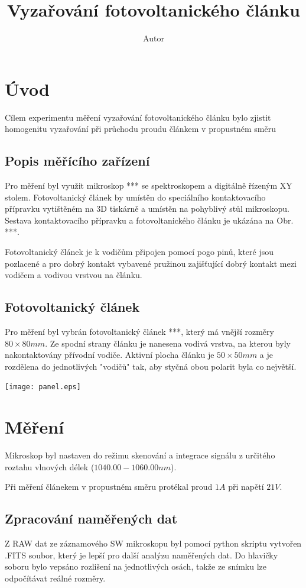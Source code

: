 \documentclass[12pt,a4paper,leqno]{report}
\author{Autor}
\title{Vyzařování fotovoltanického článku}
\begin{document}
\newpage
\tableofcontents
\newpage

\section{Úvod}

Cílem experimentu měření vyzařování fotovoltanického článku bylo zjistit homogenitu vyzařování při průchodu proudu článkem v propustném směru

\subsection{Popis měřícího zařízení}
\par Pro měření byl využit mikroskop *** se spektroskopem a digitálně řízeným XY stolem. Fotovoltanický článek by umístěn do speciálního kontaktovacího přípravku vytištěném na 3D tiskárně a umístěn na pohyblivý stůl mikroskopu. Sestava kontaktovacího přípravku a fotovoltanického článku je ukázána na Obr. ***. 

Fotovoltanický článek je k vodičům připojen pomocí pogo pinů, které jsou pozlacené a pro dobrý kontakt vybavené pružinou zajišťující dobrý kontakt mezi vodičem a vodivou vrstvou na článku.

\subsection{Fotovoltanický článek}
Pro měření byl vybrán fotovoltanický článek ***, který má vnější rozměry $80 \times 80 mm$. Ze spodní strany článku je nanesena vodivá vrstva, na kterou byly nakontaktovány přívodní vodiče. Aktivní plocha článku je $50\times50 mm$ a je rozdělena do jednotlivých "vodičů" tak, aby styčná obou polarit byla co největší.

\texttt{[image: panel.eps]}

\section{Měření}
\par Mikroskop byl nastaven do režimu skenování a integrace signálu z určitého roztahu vlnových délek ($1040.00 - 1060.00nm$).
\par Při měření článekem v propustném směru protékal proud $1A$ při napětí $21V$.

\subsection{Zpracování naměřených dat}
\par Z RAW dat ze záznamového SW mikroskopu byl pomocí python skriptu vytvořen .FITS soubor, který je lepší pro další analýzu naměřených dat. Do hlavičky soboru bylo vepsáno rozlišení na jednotlivých osách, takže ze snímku lze odpočítávat reálné rozměry.
\end{document}
